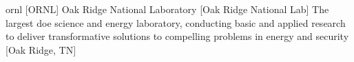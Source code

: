 \newglsXinstitution%
{ornl}%
[ORNL]%
{Oak Ridge National Laboratory}%
[Oak Ridge National Lab]%
{The largest \gls{doe} science and energy laboratory, conducting basic and applied research to deliver transformative solutions to compelling problems in energy and security \cite{website:Oak_Ridge_National_Laboratory}}%
[Oak Ridge, TN]%